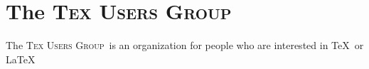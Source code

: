 \documentclass{article}
\newcommand{\TUG}{\textsc{Tex Users Group}\xspace}
\begin{document}
\section{The \TUG}
The \TUG\ is an organization for people who are interested in \TeX\ or \LaTeX\
\end{document}
